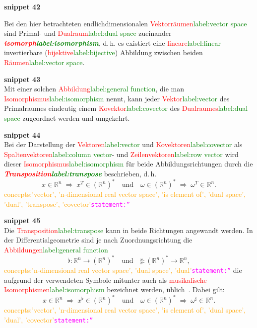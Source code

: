 \documentclass[a4paper,twoside,english,ngerman,deutsch,german,sectrefs,envcountsame,envcountchap]{svmono}
\newcommand{\setref}[2]{\textcolor{red}{#1}\textcolor{green}{#2}}
\newcommand{\snippet}[1]{\textbf{snippet #1}\\}
\newcommand{\eqnote}[2]{\textcolor{orange}{#1}\textcolor{magenta}{\texttt{#2}}}
\begin{document}
\snippet{42}
\begin{remark}
\label{rem:Isomorphismus-Primal-Dual}Bei den hier betrachteten endlichdimensionalen
\setref{Vektorräumen}{label:vector space} sind Primal- und \setref{Dualraum}{label:dual space} zueinander \textbf{\em \setref{isomorph}{label:isomorphism}},
d.\,h. es existiert eine \setref{lineare}{label:linear} invertierbare (\setref{bijektive}{label:bijective}) Abbildung zwischen beiden \setref{Räumen}{label:vector space}.




\snippet{43}
Mit einer solchen \setref{Abbildung}{label:general function}, die man \setref{Isomorphismus}{label:isomorphism} nennt, kann jeder \setref{Vektor}{label:vector} des Primalraumes eindeutig einem \setref{Kovektor}{label:covector} des \setref{Dualraumes}{label:dual space} zugeordnet werden und umgekehrt.

\snippet{44}
Bei der Darstellung der \setref{Vektoren}{label:vector} und \setref{Kovektoren}{label:covector} als \setref{Spaltenvektoren}{label:column vector}- und \setref{Zeilenvektoren}{label:row vector} wird dieser
\setref{Isomorphismus}{label:isomorphism} für beide Abbildungsrichtungen durch die \textbf{\em \setref{Transposition}{label:transpose}}
beschrieben, d.\,h.
\[
x\in{\mathbb{R}}^{n}\;\Rightarrow\;x^{T}\in({\mathbb{R}}^{n})^{*}\quad\text{und}\quad\omega\in({\mathbb{R}}^{n})^{*}\;\Rightarrow\;\omega^{T}\in{\mathbb{R}}^{n}.
\]\eqnote{concepts:'vector', 'n-dimensional real vector space', 'is element of', 'dual space', 'dual', 'transpose', 'covector'}{statement:''}

\snippet{45}
Die \setref{Transposition}{label:transpose} kann in beide Richtungen angewandt werden. In der Differentialgeometrie sind je nach Zuordnungsrichtung die \setref{Abbildungen}{label:general function}
\[
\flat:{\mathbb{R}}^{n}\to({\mathbb{R}}^{n})^{*}\quad\text{und}\quad\sharp:({\mathbb{R}}^{n})^{*}\to{\mathbb{R}}^{n},
\]\eqnote{concepts:'n-dimensional real vector space', 'dual space', 'dual'}{statement:''}
die aufgrund der verwendeten Symbole mitunter auch als \setref{musikalische Isomorphismen}{label:isomorphism} bezeichnet werden, üblich~\cite{marsden2001,bullo2004,jaenich2005}. Dabei gilt:
\[
x\in{\mathbb{R}}^{n}\;\Rightarrow\;x^{\flat}\in({\mathbb{R}}^{n})^{*}\quad\text{und}\quad\omega\in({\mathbb{R}}^{n})^{*}\;\Rightarrow\;\omega^{\sharp}\in{\mathbb{R}}^{n}.
\]\eqnote{concepts:'vector', 'n-dimensional real vector space', 'is element of', 'dual space', 'dual', 'covector'}{statement:''}
\end{remark}
\end{document}
